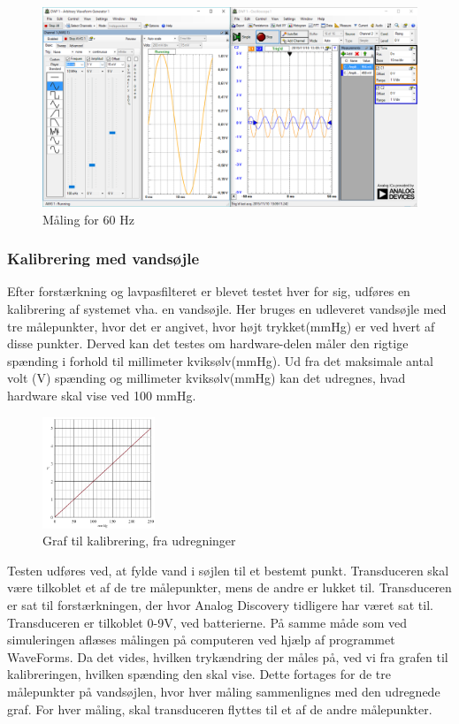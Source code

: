 \begin{figure}[H]
	\centering
	\includegraphics[width=1.0\textwidth]{Figurer/60Hz}
	\caption{Måling for 60 Hz}
	\label{fig:maeling60Hz}
\end{figure}

\subsubsection{Kalibrering med vandsøjle}
Efter forstærkning og lavpasfilteret er blevet testet hver for sig, udføres en kalibrering af systemet vha. en vandsøjle. Her bruges en udleveret vandsøjle med tre målepunkter, hvor det er angivet, hvor højt trykket(mmHg) er ved hvert af disse punkter. Derved kan det testes om hardware-delen måler den rigtige spænding i forhold til millimeter kviksølv(mmHg). Ud fra det maksimale antal volt (V) spænding og millimeter kviksølv(mmHg) kan det udregnes, hvad hardware skal vise ved 100 mmHg. 
\begin{figure}[H]
	\centering
	\includegraphics[width=0.3\textwidth]{Figurer/graf_vandtest}
	\caption{Graf til kalibrering, fra udregninger}
	\label{fig:graf_vandtest}
\end{figure}

Testen udføres ved, at fylde vand i søjlen til et bestemt punkt. Transduceren skal være tilkoblet et af de tre målepunkter, mens de andre er lukket til. Transduceren er sat til forstærkningen, der hvor Analog Discovery tidligere har været sat til. Transduceren er tilkoblet 0-9V, ved batterierne. På samme måde som ved simuleringen aflæses målingen på computeren ved hjælp af programmet WaveForms. Da det vides, hvilken trykændring der måles på, ved vi fra grafen til kalibreringen, hvilken spænding den skal vise. Dette fortages for de tre målepunkter på vandsøjlen, hvor hver måling sammenlignes med den udregnede graf. For hver måling, skal transduceren flyttes til et af de andre målepunkter.  

